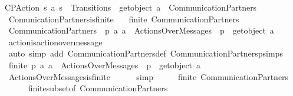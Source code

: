 \begin{isabellebody}
CPAction{\isacharcolon}{\kern0pt}\ {\isachardoublequoteopen}{\isacharparenleft}{\kern0pt}s{}{\isacharcomma}{\kern0pt}\ a{\isacharcomma}{\kern0pt}\ s{}{\isacharparenright}{\kern0pt}\ {\isasymin}\ Transitions\ {\isasymLongrightarrow}\ get{\isacharunderscore}{\kern0pt}object\ a\ {\isasymin}\ CommunicationPartners{\isachardoublequoteclose}\isanewline
\isanewline
{}\isamarkupfalse%
\ ComunicationPartners{\isacharunderscore}{\kern0pt}is{\isacharunderscore}{\kern0pt}finite{\isacharcolon}{\kern0pt}\isanewline
\ \ \ {\isachardoublequoteopen}finite\ CommunicationPartners{\isachardoublequoteclose}\isanewline
%
\isadelimproof
%
\endisadelimproof
%
\isatagproof
{}\isamarkupfalse%
\ {\isacharminus}{\kern0pt}\isanewline
\ \ \isamarkupfalse%
\ {\isachardoublequoteopen}CommunicationPartners\ {\isasymsubseteq}\ {\isacharbraceleft}{\kern0pt}p{\isachardot}{\kern0pt}\ {\isasymexists}a{\isachardot}{\kern0pt}\ a\ {\isasymin}\ ActionsOverMessages\ {\isasymand}\ p\ {\isacharequal}{\kern0pt}\ get{\isacharunderscore}{\kern0pt}object\ a{\isacharbraceright}{\kern0pt}{\isachardoublequoteclose}\isanewline
\ \ \ \ \isamarkupfalse%
\ action{\isacharunderscore}{\kern0pt}is{\isacharunderscore}{\kern0pt}action{\isacharunderscore}{\kern0pt}over{\isacharunderscore}{\kern0pt}message\isanewline
\ \ \ \ \isamarkupfalse%
\ {\isacharparenleft}{\kern0pt}auto\ simp\ add{\isacharcolon}{\kern0pt}\ CommunicationPartners{\isacharunderscore}{\kern0pt}def\ CommunicationPartnersp{\isachardot}{\kern0pt}simps{\isacharparenright}{\kern0pt}\isanewline
\ \ \isamarkupfalse%
\ \isamarkupfalse%
\ {\isachardoublequoteopen}finite\ {\isacharbraceleft}{\kern0pt}p{\isachardot}{\kern0pt}\ {\isasymexists}a{\isachardot}{\kern0pt}\ a\ {\isasymin}\ ActionsOverMessages\ {\isasymand}\ p\ {\isacharequal}{\kern0pt}\ get{\isacharunderscore}{\kern0pt}object\ a{\isacharbraceright}{\kern0pt}{\isachardoublequoteclose}\isanewline
\ \ \ \ \isamarkupfalse%
\ ActionsOverMessages{\isacharunderscore}{\kern0pt}is{\isacharunderscore}{\kern0pt}finite\isanewline
\ \ \ \ \isamarkupfalse%
\ simp\isanewline
\ \ \isamarkupfalse%
\ \isamarkupfalse%
\ {\isachardoublequoteopen}finite\ CommunicationPartners{\isachardoublequoteclose}\isanewline
\ \ \ \ \isamarkupfalse%
\ finite{\isacharunderscore}{\kern0pt}subset{\isacharbrackleft}{\kern0pt}of\ CommunicationPartners\isanewline

\end{isabellebody}
